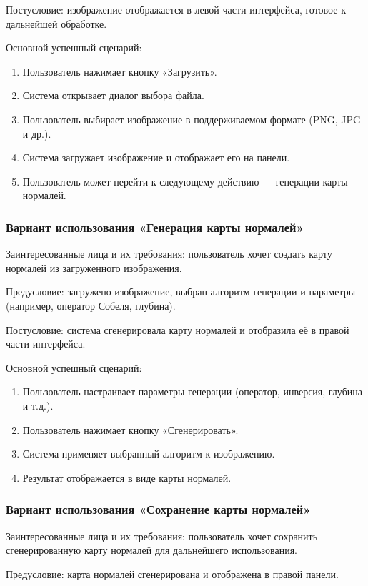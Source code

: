 Постусловие: изображение отображается в левой части интерфейса, готовое к дальнейшей обработке.

Основной успешный сценарий:
\begin{enumerate}
	\item Пользователь нажимает кнопку «Загрузить».
	\item Система открывает диалог выбора файла.
	\item Пользователь выбирает изображение в поддерживаемом формате (PNG, JPG и др.).
	\item Система загружает изображение и отображает его на панели.
	\item Пользователь может перейти к следующему действию — генерации карты нормалей.
\end{enumerate}
\subsubsection{Вариант использования «Генерация карты нормалей»}

Заинтересованные лица и их требования: пользователь хочет создать карту нормалей из загруженного изображения.

Предусловие: загружено изображение, выбран алгоритм генерации и параметры (например, оператор Собеля, глубина).

Постусловие: система сгенерировала карту нормалей и отобразила её в правой части интерфейса.

Основной успешный сценарий:
\begin{enumerate}
	\item Пользователь настраивает параметры генерации (оператор, инверсия, глубина и т.д.).
	\item Пользователь нажимает кнопку «Сгенерировать».
	\item Система применяет выбранный алгоритм к изображению.
	\item Результат отображается в виде карты нормалей.
\end{enumerate}
\subsubsection{Вариант использования «Сохранение карты нормалей»}

Заинтересованные лица и их требования: пользователь хочет сохранить сгенерированную карту нормалей для дальнейшего использования.

Предусловие: карта нормалей сгенерирована и отображена в правой панели.

